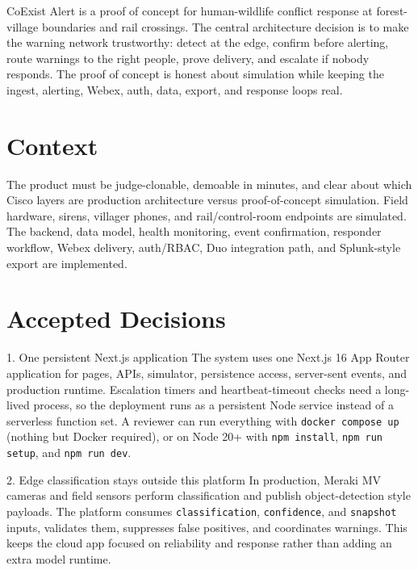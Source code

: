 \documentclass[10pt,a4paper]{article}
\begin{document}

\begin{summarybox}
CoExist Alert is a proof of concept for human-wildlife conflict response at forest-village boundaries and rail crossings. The central architecture decision is to make the warning network trustworthy: detect at the edge, confirm before alerting, route warnings to the right people, prove delivery, and escalate if nobody responds. The proof of concept is honest about simulation while keeping the ingest, alerting, Webex, auth, data, export, and response loops real.
\end{summarybox}

\section*{Context}

The product must be judge-clonable, demoable in minutes, and clear about which Cisco layers are production architecture versus proof-of-concept simulation. Field hardware, sirens, villager phones, and rail/control-room endpoints are simulated. The backend, data model, health monitoring, event confirmation, responder workflow, Webex delivery, auth/RBAC, Duo integration path, and Splunk-style export are implemented.

\section*{Accepted Decisions}

\begin{decisionbox}{1. One persistent Next.js application}
The system uses one Next.js 16 App Router application for pages, APIs, simulator, persistence access, server-sent events, and production runtime. Escalation timers and heartbeat-timeout checks need a long-lived process, so the deployment runs as a persistent Node service instead of a serverless function set. A reviewer can run everything with \texttt{docker compose up} (nothing but Docker required), or on Node 20+ with \texttt{npm install}, \texttt{npm run setup}, and \texttt{npm run dev}.
\end{decisionbox}

\begin{decisionbox}{2. Edge classification stays outside this platform}
In production, Meraki MV cameras and field sensors perform classification and publish object-detection style payloads. The platform consumes \texttt{classification}, \texttt{confidence}, and \texttt{snapshot} inputs, validates them, suppresses false positives, and coordinates warnings. This keeps the cloud app focused on reliability and response rather than adding an extra model runtime.
\end{decisionbox}
\end{document}
